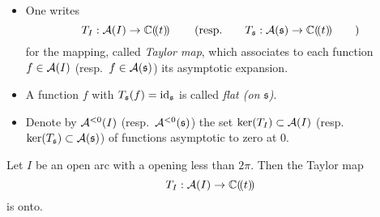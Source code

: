 \begin{defn}
  \begin{itemize}
    \item One writes
      \[
        T_{I}:\mathcal{A}(I)\to\mathbb{C}(\!(t)\!)
        \qquad\left(\text{resp.}\qquad
        T_{\mathfrak{s}}:\mathcal{A}(\mathfrak{s})\to\mathbb{C}(\!(t)\!)\qquad\right)
      \]
      for the mapping, called \emph{Taylor map}, which associates to each
      function $f\in\mathcal{A}(I)$ (resp.\ $f\in\mathcal{A}(\mathfrak{s})$) its asymptotic
      expansion.
    \item A function $f$ with $T_{\mathfrak{s}}(f)=\operatorname{id}_{\mathfrak{s}}$ is
      called \emph{flat (on $\mathfrak{s}$)}. \TODO[resp]
    \item Denote by $\mathcal{A}^{<0}(I)$ (resp.\ $\mathcal{A}^{<0}(\mathfrak{s})$) the set
      $\ker(T_{I})\subset\mathcal{A}(I)$ (resp.\
      $\ker(T_{\mathfrak{s}})\subset\mathcal{A}(\mathfrak{s})$) of functions asymptotic
      to zero at $0$.
  \end{itemize}
\end{defn}
\begin{thm}
  Let $I$ be an open arc with a opening less than $2\pi$. Then the Taylor map
  \[
    T_{I}:\mathcal{A}(I)\to\mathbb{C}(\!(t)\!)
  \]
  is onto.
\end{thm}
